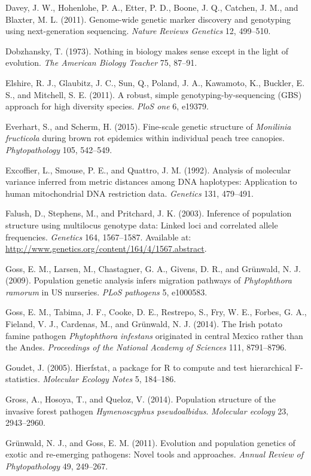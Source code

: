 \documentclass{frontiersSCNS} %
\begin{document}
Davey, J. W., Hohenlohe, P. A., Etter, P. D., Boone, J. Q., Catchen, J.
M., and Blaxter, M. L. (2011). Genome-wide genetic marker discovery and
genotyping using next-generation sequencing. \emph{Nature Reviews
Genetics} 12, 499--510.

Dobzhansky, T. (1973). Nothing in biology makes sense except in the
light of evolution. \emph{The American Biology Teacher} 75, 87--91.

Elshire, R. J., Glaubitz, J. C., Sun, Q., Poland, J. A., Kawamoto, K.,
Buckler, E. S., and Mitchell, S. E. (2011). A robust, simple
genotyping-by-sequencing (GBS) approach for high diversity species.
\emph{PloS one} 6, e19379.

Everhart, S., and Scherm, H. (2015). Fine-scale genetic structure of
\emph{Monilinia fructicola} during brown rot epidemics within individual
peach tree canopies. \emph{Phytopathology} 105, 542--549.

Excoffier, L., Smouse, P. E., and Quattro, J. M. (1992). Analysis of
molecular variance inferred from metric distances among DNA haplotypes:
Application to human mitochondrial DNA restriction data. \emph{Genetics}
131, 479--491.

Falush, D., Stephens, M., and Pritchard, J. K. (2003). Inference of
population structure using multilocus genotype data: Linked loci and
correlated allele frequencies. \emph{Genetics} 164, 1567--1587.
Available at: \url{http://www.genetics.org/content/164/4/1567.abstract}.

Goss, E. M., Larsen, M., Chastagner, G. A., Givens, D. R., and
Gr{\"{u}}nwald, N. J. (2009). Population genetic analysis infers migration
pathways of \emph{Phytophthora ramorum} in US nurseries. \emph{PLoS
pathogens} 5, e1000583.

Goss, E. M., Tabima, J. F., Cooke, D. E., Restrepo, S., Fry, W. E.,
Forbes, G. A., Fieland, V. J., Cardenas, M., and Gr{\"{u}}nwald, N. J.
(2014). The Irish potato famine pathogen \emph{Phytophthora infestans}
originated in central Mexico rather than the Andes. \emph{Proceedings of
the National Academy of Sciences} 111, 8791--8796.

Goudet, J. (2005). Hierfstat, a package for R to compute and test
hierarchical F-statistics. \emph{Molecular Ecology Notes} 5, 184--186.

Gross, A., Hosoya, T., and Queloz, V. (2014). Population structure of
the invasive forest pathogen \emph{Hymenoscyphus pseudoalbidus}.
\emph{Molecular ecology} 23, 2943--2960.

Gr\"{u}nwald, N. J., and Goss, E. M. (2011). Evolution and population
genetics of exotic and re-emerging pathogens: Novel tools and
approaches. \emph{Annual Review of Phytopathology} 49, 249--267.
\end{document}
